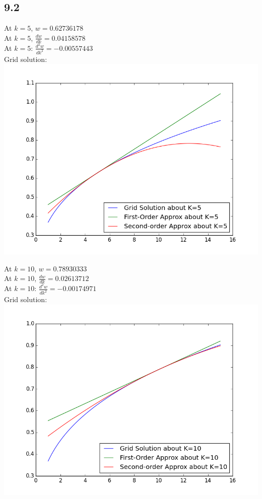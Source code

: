 \documentclass[letterpaper,12pt]{article}
\theoremstyle{definition}
\begin{document}
\subsection*{9.2}


At $k=5$, $w = 0.62736178$\\
At $k=5$, $ \frac{dw}{dk} = 0.04158578$\\
At $k = 5$: $ \frac{d^2w}{dk^2} = -0.00557443$\\
Grid solution: \\
\includegraphics[scale = .75]{k5approx}
\newpage

At $k=10$, $w =0.78930333$\\
At $k=10$, $ \frac{dw}{dk} = 0.02613712$\\
At $k = 10$: $ \frac{d^2w}{dk^2} = -0.00174971$\\
Grid solution: \\
\includegraphics[scale = .75]{k10approx}
\end{document}
